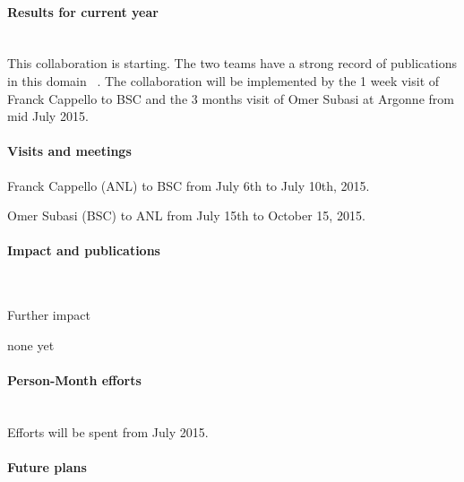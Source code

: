 \begin{refsection}
\paragraph{Results for current year}~\\

This collaboration is starting. The two teams have a strong record of publications in this domain ~\cite{Leo-PPoPP2014,Edu-HPDC2015,Di-CCGRID2015,Edu-SC2014}.
The collaboration will be implemented by the 1 week visit of Franck Cappello to BSC and the 3 months visit of Omer Subasi at Argonne from mid July 2015. 

\paragraph{Visits and meetings}

\begin{itemize*}
 \item Franck Cappello (ANL) to BSC from July 6th to July 10th, 2015.
 \item Omer Subasi (BSC) to ANL from July 15th to October 15, 2015.
\end{itemize*}


\paragraph{Impact and publications}~\\

\printbibliography[heading=none,keyword=own]

Further impact
\begin{itemize*}
    \item none yet
\end{itemize*}

\paragraph{Person-Month efforts}~\\

Efforts will be spent from July 2015.

\paragraph{Future plans}~\\


\end{refsection}
